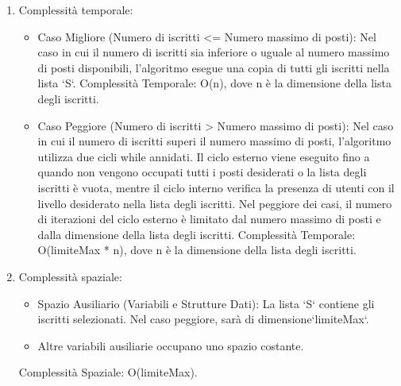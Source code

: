 \begin{enumerate}
	\item Complessità temporale: 
        \begin{itemize}
            \item Caso Migliore (Numero di iscritti <= Numero massimo di posti):
                Nel caso in cui il numero di iscritti sia inferiore o uguale al numero massimo di posti disponibili, l'algoritmo esegue una copia di tutti gli iscritti nella lista `S`.
                Complessità Temporale: O(n), dove n è la dimensione della lista degli iscritti.
            \item Caso Peggiore (Numero di iscritti > Numero massimo di posti):
                Nel caso in cui il numero di iscritti superi il numero massimo di posti, l'algoritmo utilizza due cicli while annidati. Il ciclo esterno viene eseguito fino a quando non vengono occupati tutti i posti desiderati o la lista degli iscritti è vuota, mentre il ciclo interno verifica la presenza di utenti con il livello desiderato nella lista degli iscritti.
                Nel peggiore dei casi, il numero di iterazioni del ciclo esterno è limitato dal numero massimo di posti e dalla dimensione della lista degli iscritti.
                Complessità Temporale: O(limiteMax * n), dove n è la dimensione della lista degli
                iscritti.
        \end{itemize}
	\item Complessità spaziale: 
        \begin{itemize}
            \item Spazio Ausiliario (Variabili e Strutture Dati): La lista `S` contiene gli             iscritti selezionati. Nel caso peggiore, sarà di dimensione`limiteMax`.
            \item Altre variabili ausiliarie occupano uno spazio costante.
        \end{itemize}    
            Complessità Spaziale: O(limiteMax).
\end{enumerate}



